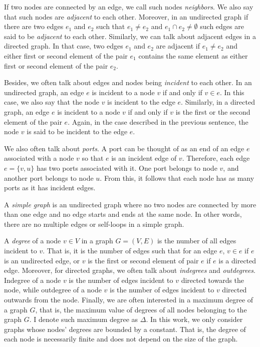 If two nodes are connected by an edge, we call such nodes \emph{neighbors}. We
also say that such nodes are \emph{adjacent} to each other. Moreover, in an undirected graph
if there are two edges $e_1$ and $e_2$ such that $e_1 \neq e_2$ and $e_1 \cap e_2 \neq \emptyset$
such edges are said to be \emph{adjacent} to each other. Similarly, we can talk about adjacent 
edges in a directed graph. In that case, two edges $e_1$ and $e_2$ are adjacent if
$e_1 \neq e_2$ and either first or second element of the pair $e_1$ contains the same
element as either first or second element of the pair $e_2$.

Besides, we often talk about edges and nodes being \emph{incident} to each other.
In an undirected graph, an edge $e$ is incident to a node $v$ if and only if $v \in e$. In this
case, we also say that the node $v$ is incident to the edge $e$. Similarly, in a
directed graph, an edge $e$ is incident to a node $v$ if and only if $v$ is the
first or the second element of the pair $e$. Again, in the case described in the
previous sentence, the node $v$ is said to be incident to the edge $e$.

We also often talk about \emph{ports}. A port can be thought of as an end
of an edge $e$ associated with a node $v$ so that $e$ is an incident edge
of $v$. Therefore, each edge $e = \{v, u\}$ has two ports associated
with it. One port belongs to node $v$, and another port belongs to
node $u$. From this, it follows that each node has as many ports
as it has incident edges.

A \emph{simple graph} is an undirected graph where no two nodes are connected by more
than one edge and no edge starts and ends at the same node. In other words, there are
no multiple edges or self-loops in a simple graph.

A \emph{degree} of a node $v \in V$ in a graph $G = (V, E)$ is the number of all
edges incident to $v$. That is, it is the number of edges such that for an edge
$e$, $v \in e$ if $e$ is an undirected edge, or $v$ is the first or second element of
pair $e$ if $e$ is a directed edge. Moreover, for directed graphs, we often talk
about \emph{indegrees} and \emph{outdegrees}. Indegree of a node $v$ is the number
of edges incident to $v$ directed towards the node, while outdegree of a node $v$ is the 
number of edges incident to $v$ directed outwards from the node. Finally, we are 
often interested in a maximum degree of a graph $G$, that is, the maximum value of
degrees of all nodes belonging to the graph $G$. I denote such maximum degree as
$\Delta$. In this work, we only consider graphs whose nodes' degrees
are bounded by a constant. That is, the degree of each node is
necessarily finite and does not depend on the size of the graph.

